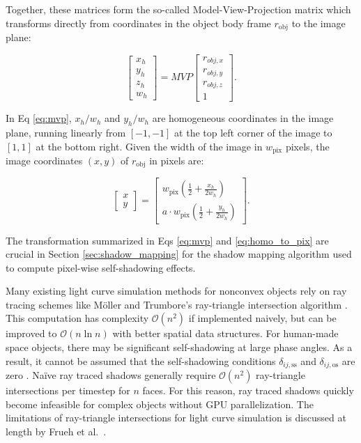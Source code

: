 Together, these matrices form the so-called Model-View-Projection matrix which transforms directly from coordinates in the object body frame $r_\mathrm{obj}$ to the image plane:

\begin{equation} \label{eq:mvp}
  \begin{bmatrix} x_h \\ y_h \\ z_h \\w_h \end{bmatrix} = M V P \begin{bmatrix} r_{obj,x} \\ r_{obj,y} \\ r_{obj,z} \\ 1 \end{bmatrix}.
\end{equation}

In Eq \ref{eq:mvp}, $x_h/w_h$ and $y_h/w_h$ are homogeneous coordinates in the image plane, running linearly from $[-1, -1]$ at the top left corner of the image to $[1, 1]$ at the bottom right. Given the width of the image in $w_\mathrm{pix}$ pixels, the image coordinates $\left(x,y\right)$ of $r_\mathrm{obj}$ in pixels are:

\begin{equation} \label{eq:homo_to_pix}
  \begin{bmatrix} x \\ y \end{bmatrix} = \begin{bmatrix} w_\mathrm{pix} \left(\frac{1}{2} + \frac{x_h}{2w_h}\right) \\ a \cdot w_\mathrm{pix}\left(\frac{1}{2} + \frac{y_h}{2w_h}\right) \end{bmatrix}.
\end{equation}

The transformation summarized in Eqs \ref{eq:mvp} and \ref{eq:homo_to_pix} are crucial in Section \ref{sec:shadow_mapping} for the shadow mapping algorithm used to compute pixel-wise self-shadowing effects.

Many existing light curve simulation methods for nonconvex objects rely on ray tracing schemes like Möller and Trumbore's ray-triangle intersection algorithm \cite{moller2005,fan2020thesis}. This computation has complexity $\mathcal{O}(n^2)$ if implemented naively, but can be improved to $\mathcal{O}(n \ln n)$ with better spatial data structures. For human-made space objects, there may be significant self-shadowing at large phase angles. As a result, it cannot be assumed that the self-shadowing conditions $\delta_{ij,\text{ss}}$ and $\delta_{ij,\text{os}}$ are zero \cite{frueh2014,fan2020thesis}. Naïve ray traced shadows generally require $\mathcal{O}(n^2)$ ray-triangle intersections per timestep for $n$ faces. For this reason, ray traced shadows quickly become infeasible for complex objects without GPU parallelization. The limitations of ray-triangle intersections for light curve simulation is discussed at length by Frueh et al.\ \cite{frueh2014}.

